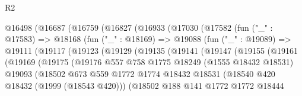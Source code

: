 \begin{lexlean}{R2}
\begin{coremodule}
                @16498
                  (@16687
                    (@16759
                      (@16827
                        (@16933
                          (@17030
                            (@17582
                              (fun ("_" : @17583) =>
                              @18168
                                (fun ("_" : @18169) =>
                                @19088
                                  (fun ("_" : @19089) =>
                                  @19111
                                    (@19117
                                      (@19123
                                        (@19129
                                          (@19135
                                            (@19141
                                              (@19147
                                                (@19155
                                                  (@19161
                                                    (@19169
                                                      (@19175
                                                        (@19176
                                                          @557
                                                          @758
                                                          @1775
                                                          @18249
                                                          (@1555 @18432 @18531)
                                                          @19093
                                                          (@18502
                                                            @673
                                                            @559
                                                            @1772
                                                            @1774
                                                            @18432
                                                            @18531
                                                            (@18540
                                                              @420
                                                              @18432
                                                              (@1999 (@18543 @420)))
                                                            (@18502
                                                              @188
                                                              @141
                                                              @1772
                                                              @1772
                                                              @18444

\end{coremodule}
\end{lexlean}
